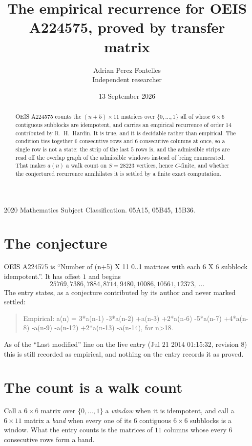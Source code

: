 \documentclass[11pt,a4paper]{article}
\title{The empirical recurrence for OEIS A224575, proved by transfer matrix}
\author{Adrian Perez Fontelles\\ \small Independent researcher}
\date{13 September 2026}
\theoremstyle{plain}
\theoremstyle{definition}
\begin{document}
\maketitle

\begin{abstract}
OEIS A224575 counts the $(n+5)\times11$ matrices over $\{0,\dots,1\}$ all of whose
$6\times6$ contiguous subblocks are idempotent, and carries an empirical recurrence of order
$14$ contributed by R.~H.~Hardin. It is true, and it is decidable rather than empirical.
The condition ties together $6$ consecutive rows and $6$ consecutive columns at once, so a
single row is not a state; the strip of the last $5$ rows is, and the admissible strips
are read off the overlap graph of the admissible windows instead of being enumerated. That
makes $a(n)$ a walk count on $S=28223$ vertices, hence $C$-finite, and whether the conjectured
recurrence annihilates it is settled by a finite exact computation.
\end{abstract}

\noindent\small 2020 Mathematics Subject Classification. 05A15, 05B45, 15B36.\normalsize

\section{The conjecture}

OEIS A224575 is ``Number of (n+5) X 11 0..1 matrices with each 6 X 6 subblock idempotent.''. It has offset $1$ and begins
\[
25769, 7386, 7884, 8714, 9480, 10086, 10561, 12373,\ \dots
\]
The entry states, as a conjecture contributed by its author and never marked settled:
\begin{quote}
Empirical: a(n) = 3*a(n-1) -3*a(n-2) +a(n-3) +2*a(n-6) -5*a(n-7) +4*a(n-8) -a(n-9) -a(n-12) +2*a(n-13) -a(n-14), for n>18.
\end{quote}
As of the ``Last modified'' line on the live entry (Jul 21 2014 01:15:32, revision 8) this is still
recorded as empirical, and nothing on the entry records it as proved.

\section{The count is a walk count}

Call a $6\times6$ matrix over $\{0,\dots,1\}$ a \emph{window} when it is idempotent, and
call a $6\times11$ matrix a \emph{band} when every one of its $6$ contiguous
$6\times6$ subblocks is a window. What the entry counts is the matrices of $11$ columns
whose every $6$ consecutive rows form a band.
\end{document}
